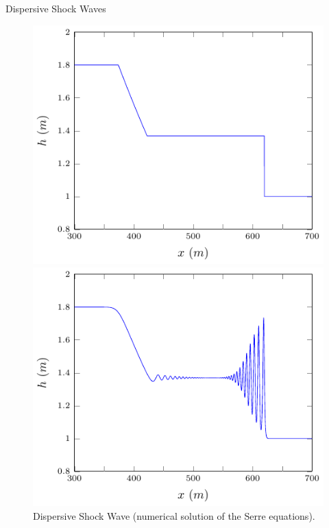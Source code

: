 \documentclass[pdf]{beamer}
\begin{document}
\begin{frame}{Dispersive Shock Waves}
		
   \begin{figure}
    	\centering
    	\begin{minipage}{.5\textwidth}
    		\centering
    		\includegraphics[width=0.95\linewidth]{./Pictures/DSW/SW.pdf}
    		\caption{Shock Wave (analytical solution of the shallow water wave equations).}
    	\end{minipage}%
    	\pause
    	\begin{minipage}{.5\textwidth}
    		\centering
    		\includegraphics[width=0.95\linewidth]{./Pictures/DSW/DSW.pdf}
    		\caption{Dispersive Shock Wave (numerical solution of the Serre equations).}
    	\end{minipage}
   \end{figure}
\end{frame}
\end{document}
